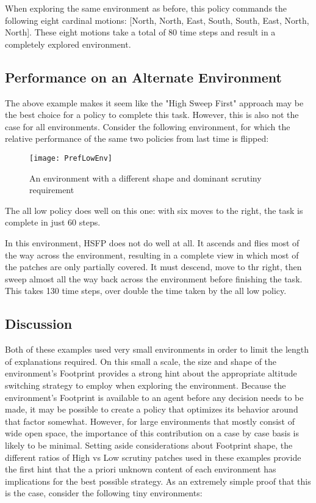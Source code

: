 When exploring the same environment as before, this policy commands the following eight cardinal motions: [North, North, East, South, South, East, North, North]. These eight motions take a total of 80 time steps and result in a completely explored environment.

\subsection{Performance on an Alternate Environment}

The above example makes it seem like the "High Sweep First" approach may be the best choice for a policy to complete this task. However, this is also not the case for all environments. Consider the following environment, for which the relative performance of the same two policies from last time is flipped:

\begin{figure}[H]
\texttt{[image: PrefLowEnv]}
\caption[Long Thin Environment]{An environment with a different shape and dominant scrutiny requirement}
\label{fig:3-2-env}
\end{figure}

The all low policy does well on this one: with six moves to the right, the task is complete in just 60 steps.

In this environment, HSFP does not do well at all. It ascends and flies most of the way across the environment, resulting in a complete view in which most of the patches are only partially covered. It must descend, move to thr right, then sweep almost all the way back across the environment before finishing the task. This takes 130 time steps, over double the time taken by the all low policy.

\subsection{Discussion}

Both of these examples used very small environments in order to limit the length of explanations required. On this small a scale, the size and shape of the environment's Footprint provides a strong hint about the appropriate altitude switching strategy to employ when exploring the environment. Because the environment's Footprint is available to an agent before any decision needs to be made, it may be possible to create a policy that optimizes its behavior around that factor somewhat. However, for large environments that mostly consist of wide open space, the importance of this contribution on a case by case basis is likely to be minimal. Setting aside considerations about Footprint shape, the different ratios of High vs Low scrutiny patches used in these examples provide the first hint that the a priori unknown content of each environment has implications for the best possible strategy. As an extremely simple proof that this is the case, consider the following tiny environments:

